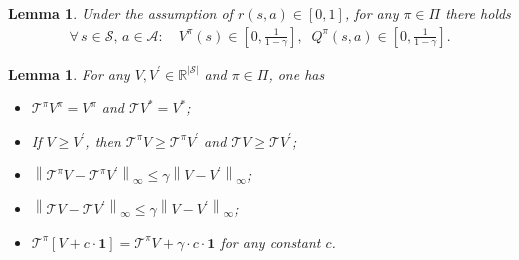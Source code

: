 \documentclass[10pt]{article}
\newcommand{\calA}{\mathcal{A}}
\newcommand{\calS}{\mathcal{S}}
\newcommand{\calT}{\mathcal{T}}
\newcommand{\E}{\mathbb{E}}
\newcommand{\ls}{\left}
\newcommand{\rs}{\right}
\theoremstyle{plain}
\newtheorem{lemma}[theorem]{Lemma}
\theoremstyle{definition}
\begin{document}
\begin{lemma}
    Under the assumption of $r(s,a) \in [0,1]$, for any $\pi \in \Pi$ there holds
    \begin{align*}
        \forall \, s\in\calS, \, a\in\calA: \quad V^\pi(s) \in \ls[0, \frac{1}{1-\gamma}\rs], \;\; Q^\pi(s,a) \in \ls[ 0, \frac{1}{1-\gamma} \rs].
    \end{align*}
    \label{lem:bounded-values}
\end{lemma}

\begin{lemma}
    For any $V, V^\prime \in \mathbb{R}^{|\calS|}$ and $\pi \in \Pi$, one has
    \begin{itemize}
        \item[1)]  $\calT^\pi V^\pi = V^\pi$ and $\calT V^* = V^*$;
        \item[2)]  If $V \geq V^\prime$, then $\calT^\pi V \geq \calT^\pi V^\prime$ and $\calT V \geq \calT V^\prime$;
        \item[3)]  $
        \ls\| \calT^\pi V - \calT^\pi V^\prime  \rs\|_\infty \leq \gamma \ls\| V - V^\prime \rs\|_\infty$;
        \item[4)] $
        \ls\| \calT V - \calT V^\prime \rs\|_\infty \leq \gamma \ls\| V - V^\prime \rs\|_\infty$;
        \item[5)] $\calT^\pi[V + c\cdot \mathbf{1}] = \calT^\pi V + \gamma\cdot c\cdot \mathbf{1}$ for any constant $c$.
    \end{itemize}
    \label{lemma:Bellman-property}
\end{lemma}

\end{document}
